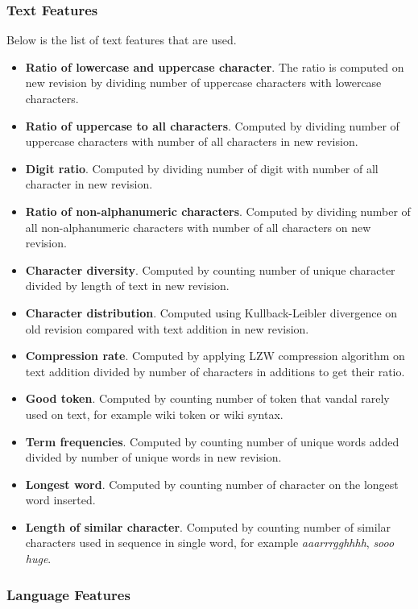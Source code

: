 \documentclass[conference,compsoc,a4paper,twocolumn,final]{IEEEtran}
\begin{document}
\subsubsection{Text Features}

Below is the list of text features that are used.

\begin{itemize}
\item \textbf{Ratio of lowercase and uppercase character}. The ratio is
computed on new revision by dividing number of uppercase characters with
lowercase characters.
\item \textbf{Ratio of uppercase to all characters}. Computed by dividing
number of uppercase characters with number of all characters in new revision.
\item \textbf{Digit ratio}. Computed by dividing number of digit with number of
all character in new revision.
\item \textbf{Ratio of non-alphanumeric characters}. Computed by dividing
number of all non-alphanumeric characters with number of all characters on new
revision.
\item \textbf{Character diversity}. Computed by counting number of unique
character divided by length of text in new revision.
\item \textbf{Character distribution}. Computed using Kullback-Leibler
divergence on old revision compared with text addition in new revision.
\item \textbf{Compression rate}. Computed by applying LZW compression algorithm
on text addition divided by number of characters in additions to get their
ratio.
\item \textbf{Good token}. Computed by counting number of token that vandal
rarely used on text, for example wiki token or wiki syntax.
\item \textbf{Term frequencies}. Computed by counting number of unique words
added divided by number of unique words in new revision.
\item \textbf{Longest word}. Computed by counting number of character on the
longest word inserted.
\item \textbf{Length of similar character}. Computed by counting number of
similar characters used in sequence in single word, for example
\textit{aaarrrgghhhh}, \textit{sooo huge}.
\end{itemize}

\subsubsection{Language Features}
\end{document}
